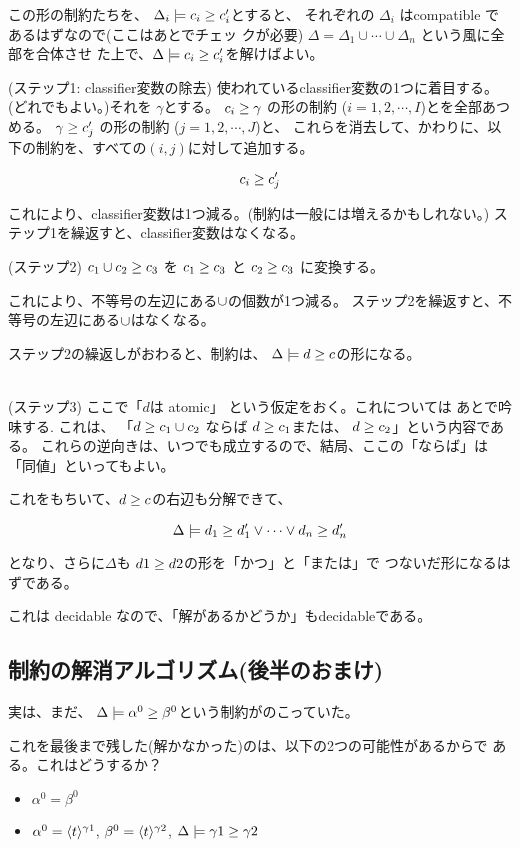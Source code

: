 この形の制約たちを、
$\Delta_i \models {c_i} \ge {c'_i}$とすると、
それぞれの $\Delta_i$ はcompatible であるはずなので(ここはあとでチェッ
クが必要)
$\Delta = \Delta_1 \cup \cdots \cup \Delta_n$ という風に全部を合体させ
た上で、$\Delta \models {c_i} \ge {c'_i}$を解けばよい。

(ステップ1: classifier変数の除去)
使われているclassifier変数の1つに着目する。(どれでもよい。)それを
$\gamma$とする。
${c_i} \ge {\gamma}$ の形の制約 ($i=1,2,\cdots,I$)とを全部あつめる。
${\gamma} \ge {c'_j}$ の形の制約 ($j=1,2,\cdots,J$)と、
これらを消去して、かわりに、以下の制約を、すべての$(i,j)$に対して追加する。

\[
  {c_i} \ge {c'_j}
\]

これにより、classifier変数は1つ減る。(制約は一般には増えるかもしれない。)
ステップ1を繰返すと、classifier変数はなくなる。

(ステップ2) ${c_1 \cup c_2} \ge {c_3}$ を
${c_1} \ge {c_3}$ と
${c_2} \ge {c_3}$ に変換する。

これにより、不等号の左辺にある$\cup$の個数が1つ減る。
ステップ2を繰返すと、不等号の左辺にある$\cup$はなくなる。

ステップ2の繰返しがおわると、制約は、
$\Delta \models {d} \ge {c}$の形になる。

\\
(ステップ3) ここで「$d$は atomic」 という仮定をおく。これについては
あとで吟味する.
これは、
「${d} \ge {c_1 \cup c_2}$ ならば
${d} \ge {c_1}$または、
${d} \ge {c_2}$」という内容である。
これらの逆向きは、いつでも成立するので、結局、ここの「ならば」は「同値」といってもよい。

これをもちいて、${d} \ge {c}$の右辺も分解できて、

\[
  \Delta \models {d_1} \ge {d_1'} \vee \cdots \vee {d_n} \ge {d'_n}
\]

となり、さらに$\Delta$も ${d1} \ge {d2}$の形を「かつ」と「または」で
つないだ形になるはずである。

これは decidable なので、「解があるかどうか」もdecidableである。

\subsection{制約の解消アルゴリズム(後半のおまけ)}

実は、まだ、
$\Delta \models {\alpha^0} \ge {\beta^0}$という制約がのこっていた。

これを最後まで残した(解かなかった)のは、以下の2つの可能性があるからで
ある。これはどうするか？

\begin{itemize}
\item $\alpha^0 = \beta^0$
\item
  $\alpha^0 = \langle{t}\rangle^{\gamma1}$,
  $\beta^0 = \langle{t}\rangle^{\gamma2}$,
  $\Delta \models {\gamma1} \ge {\gamma2}$
\end{itemize}



